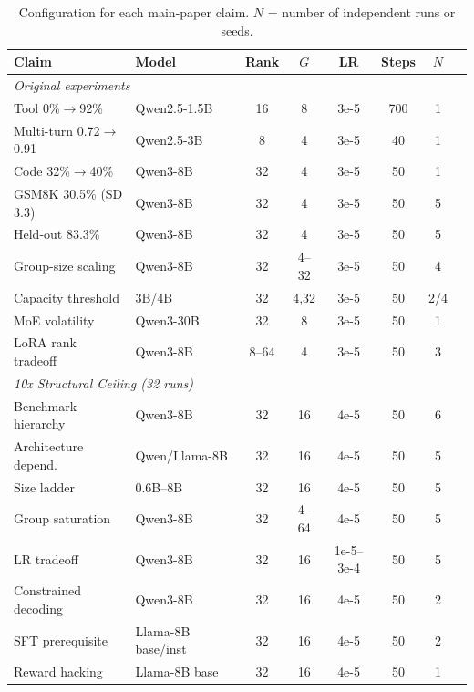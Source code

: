 \documentclass{article}
\begin{document}
\begin{table}[htbp]
    \centering
    \footnotesize
    \caption{Configuration for each main-paper claim. $N$ = number of independent runs or seeds.}
    \begin{tabular}{p{3.2cm}lcccccc}
        \toprule
        Claim & Model & Rank & $G$ & LR & Steps & $N$ \\
        \midrule
        \multicolumn{7}{l}{\emph{Original experiments}} \\
        Tool 0\%$\to$92\% & Qwen2.5-1.5B & 16 & 8 & 3e-5 & 700 & 1 \\
        Multi-turn 0.72$\to$0.91 & Qwen2.5-3B & 8 & 4 & 3e-5 & 40 & 1 \\
        Code 32\%$\to$40\% & Qwen3-8B & 32 & 4 & 3e-5 & 50 & 1 \\
        GSM8K 30.5\% (SD 3.3) & Qwen3-8B & 32 & 4 & 3e-5 & 50 & 5 \\
        Held-out 83.3\% & Qwen3-8B & 32 & 4 & 3e-5 & 50 & 5 \\
        Group-size scaling & Qwen3-8B & 32 & 4--32 & 3e-5 & 50 & 4 \\
        Capacity threshold & 3B/4B & 32 & 4,32 & 3e-5 & 50 & 2/4 \\
        MoE volatility & Qwen3-30B & 32 & 8 & 3e-5 & 50 & 1 \\
        LoRA rank tradeoff & Qwen3-8B & 8--64 & 4 & 3e-5 & 50 & 3 \\
        \midrule
        \multicolumn{7}{l}{\emph{10x Structural Ceiling (32 runs)}} \\
        Benchmark hierarchy & Qwen3-8B & 32 & 16 & 4e-5 & 50 & 6 \\
        Architecture depend. & Qwen/Llama-8B & 32 & 16 & 4e-5 & 50 & 5 \\
        Size ladder & 0.6B--8B & 32 & 16 & 4e-5 & 50 & 5 \\
        Group saturation & Qwen3-8B & 32 & 4--64 & 4e-5 & 50 & 5 \\
        LR tradeoff & Qwen3-8B & 32 & 16 & 1e-5--3e-4 & 50 & 5 \\
        Constrained decoding & Qwen3-8B & 32 & 16 & 4e-5 & 50 & 2 \\
        SFT prerequisite & Llama-8B base/inst & 32 & 16 & 4e-5 & 50 & 2 \\
        Reward hacking & Llama-8B base & 32 & 16 & 4e-5 & 50 & 1 \\
        \bottomrule
    \end{tabular}
    \label{tab:config_map}
\end{table}
\end{document}
